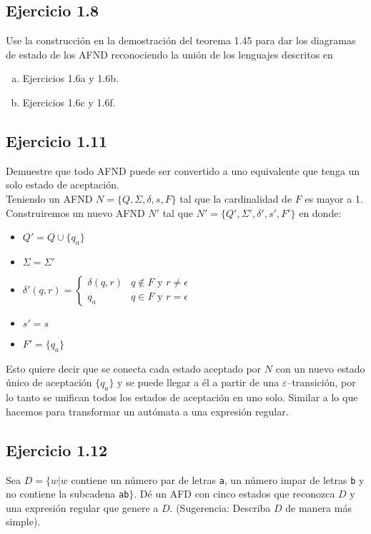 \documentclass{article}
\begin{document}
\subsection*{Ejercicio 1.8}
Use la construcción en la demostración del teorema 1.45 para dar los diagramas de estado de los AFND reconociendo la unión de los lenguajes descritos en
\begin{enumerate}[a.]
    \item Ejercicios 1.6a y 1.6b.
    
    \item Ejercicios 1.6c y 1.6f.
\end{enumerate}

\subsection*{Ejercicio 1.11}
Demuestre que todo AFND puede ser convertido a uno equivalente que tenga un solo estado de aceptación.\vspace{0.5em}\\
Teniendo un AFND $N=\{Q,\Sigma,\delta,s,F\}$ tal que la cardinalidad de $F$ es mayor a 1. Construiremos un nuevo AFND $N'$ tal que $N'=\{Q',\Sigma',\delta',s',F'\}$ en donde:
\begin{itemize}
    \item $Q'=Q\cup\{q_a\}$
    
    \item $\Sigma=\Sigma'$
    
    \item $\delta'(q,r)=\left\{
    \begin{array}{ll}
        \delta(q,r) & q\not\in F\text{ y }r\not=\epsilon\\
        q_a & q\in F\text{ y }r=\epsilon
    \end{array}
    \right.$
    
    \item $s'=s$
    
    \item $F'=\{q_a\}$
\end{itemize}
Esto quiere decir que se conecta cada estado aceptado por $N$ con un nuevo estado único de aceptación $\{q_a\}$ y se puede llegar a él a partir de una $\varepsilon$–transición, por lo tanto se unifican todos los estados de aceptación en uno solo. Similar a lo que hacemos para transformar un autómata a una expresión regular.

\subsection*{Ejercicio 1.12}
Sea $D = \{w|w$ contiene un número par de letras \texttt{a}, un número impar de letras \texttt{b} y no contiene la subcadena \texttt{ab}$\}$. Dé un AFD con cinco estados que reconozca $D$ y una expresión regular que genere a $D$. (Sugerencia: Describa $D$ de manera más simple).

\end{document}
